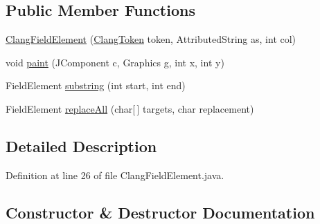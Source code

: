 \subsection*{Public Member Functions}
\begin{DoxyCompactItemize}
\item 
\mbox{\hyperlink{classghidra_1_1app_1_1decompiler_1_1component_1_1_clang_field_element_a557c4aea8e9cecacb4508e4938722a7b}{Clang\+Field\+Element}} (\mbox{\hyperlink{classghidra_1_1app_1_1decompiler_1_1_clang_token}{Clang\+Token}} token, Attributed\+String as, int col)
\item 
void \mbox{\hyperlink{classghidra_1_1app_1_1decompiler_1_1component_1_1_clang_field_element_a29f41d0996ebfc39f427636021736ad4}{paint}} (J\+Component c, Graphics g, int x, int y)
\item 
Field\+Element \mbox{\hyperlink{classghidra_1_1app_1_1decompiler_1_1component_1_1_clang_field_element_ac5f021e840bc45a79878e059a408d519}{substring}} (int start, int end)
\item 
Field\+Element \mbox{\hyperlink{classghidra_1_1app_1_1decompiler_1_1component_1_1_clang_field_element_a2aeb0f4ecf97c903188cf0a973754a80}{replace\+All}} (char\mbox{[}$\,$\mbox{]} targets, char replacement)
\end{DoxyCompactItemize}


\subsection{Detailed Description}


Definition at line 26 of file Clang\+Field\+Element.\+java.



\subsection{Constructor \& Destructor Documentation}
\mbox{\label{classghidra_1_1app_1_1decompiler_1_1component_1_1_clang_field_element_a557c4aea8e9cecacb4508e4938722a7b}} 
